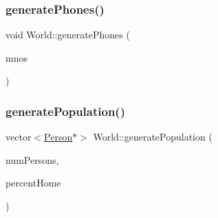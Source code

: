 \mbox{\label{class_world_af4389a47e4f2dd361300a1e8e78fed6c}} 
\subsubsection{\texorpdfstring{generate\+Phones()}{generatePhones()}}
{\footnotesize\ttfamily void World\+::generate\+Phones (\begin{DoxyParamCaption}\item[{vector$<$ \hyperlink{class_mobile_operator}{Mobile\+Operator} $\ast$$>$}]{mnos }\end{DoxyParamCaption})\hspace{0.3cm}{\ttfamily [private]}}

\mbox{\label{class_world_ada780d7d546a1dad038c83aad3f696df}} 
\subsubsection{\texorpdfstring{generate\+Population()}{generatePopulation()}\hspace{0.1cm}{\footnotesize\ttfamily [1/2]}}
{\footnotesize\ttfamily vector$<$\hyperlink{class_person}{Person}$\ast$$>$ World\+::generate\+Population (\begin{DoxyParamCaption}\item[{unsigned long}]{num\+Persons,  }\item[{double}]{percent\+Home }\end{DoxyParamCaption})\hspace{0.3cm}{\ttfamily [private]}}

\mbox{\label{class_world_aab92523ca0922b67e4ec77f37939edc1}} 
